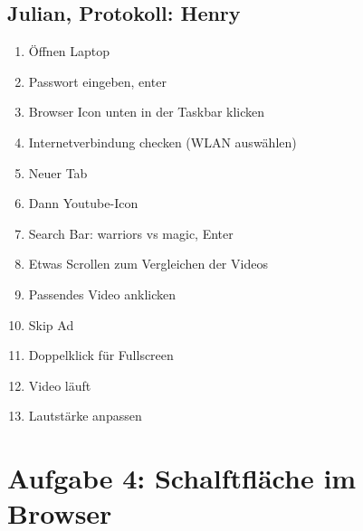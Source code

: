 \documentclass[a4paper,10pt]{article}
\begin{document}
    \subsection{Julian, Protokoll: Henry}
    \begin{enumerate}
        \item Öffnen Laptop
        \item Passwort eingeben, enter
        \item Browser Icon unten in der Taskbar klicken
        \item Internetverbindung checken (WLAN auswählen)
        \item Neuer Tab
        \item Dann Youtube-Icon
        \item Search Bar: warriors vs magic, Enter
        \item Etwas Scrollen zum Vergleichen der Videos
        \item Passendes Video anklicken
        \item Skip Ad
        \item Doppelklick für Fullscreen
        \item Video läuft
        \item Lautstärke anpassen
    \end{enumerate}

    \section{Aufgabe 4: Schalftfläche im Browser}
\end{document}
